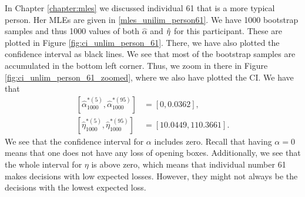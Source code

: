 In Chapter \ref{chapter:mles} we discussed individual 61 that is a more typical person. Her MLEs are given in \eqref{mles_unilim_person61}.
We have 1000 bootstrap samples and thus 1000 values of both $\hat{\alpha}$ and $\hat{\eta}$ for this participant. These are plotted in Figure \ref{fig:ci_unlim_person_61}. There, we have also plotted the confidence interval as black lines. We see that most of the bootstrap samples are accumulated in the bottom left corner. Thus, we zoom in there in Figure \ref{fig:ci_unlim_person_61_zoomed}, where we also have plotted the CI. We have that
\begin{equation*}
    \begin{aligned}
         \left[ \hat{\alpha}^{*(5)}_{1000},\hat{\alpha}^{*(95)}_{1000}\right] &= [0,0.0362],\\
         \left[\hat{\eta}^{*(5)}_{1000},\hat{\eta}^{*(95)}_{1000}\right] &= [10.0449,110.3661].
    \end{aligned}
\end{equation*}
We see that the confidence interval for $\alpha$ includes zero. Recall that having $\alpha=0$ means that one does not have any loss of opening boxes. Additionally, we see that the whole interval for $\eta$ is above zero, which means that individual number 61 makes decisions with low expected losses. However, they might not always be the decisions with the lowest expected loss. 



